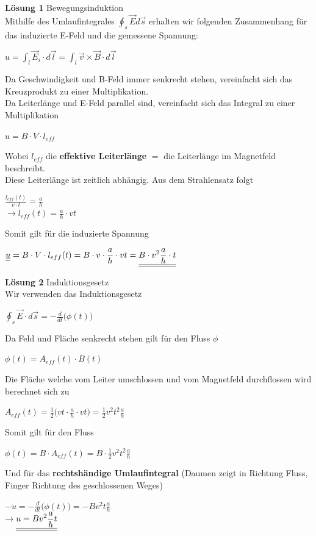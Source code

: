 \beginbsp


\textbf{Lösung 1} Bewegungsinduktion \\
Mithilfe des Umlaufintegrales $\displaystyle \oint_s \vec{E} d\vec{s}$ erhalten wir folgenden Zusammenhang für das induzierte E-Feld und die gemessene Spannung:
\begin{center}
  $ \displaystyle u = \int_l \vec{E}_i \cdot d\vec{l} = \int_l \vec{v} \times \vec{B} \cdot d \vec{l}$
\end{center}
Da Geschwindigkeit und B-Feld immer senkrecht stehen, vereinfacht sich das Kreuzprodukt zu einer Multiplikation. \\
Da Leiterlänge und E-Feld parallel sind, vereinfacht sich das Integral zu einer Multiplikation
\begin{center}
  $\displaystyle u = B \cdot V \cdot l_{eff}$
\end{center}
Wobei $l_{eff}$ die \textbf{effektive Leiterlänge} $=$ die Leiterlänge im Magnetfeld beschreibt. \\
Diese Leiterlänge ist zeitlich abhängig. Aus dem Strahlensatz folgt
\begin{center}
  $\frac{l_{eff}(t)}{v \cdot t} = \frac{a}{h}$ \\
  $\rightarrow l_{eff} (t) =  \frac{a}{h} \cdot vt$
\end{center}
Somit gilt für die induzierte Spannung
\begin{center}

    $\displaystyle  \underline{\underline{ u}} = B \cdot V \cdot l_{eff}(t) = B \cdot v \cdot  \frac{a}{h} \cdot vt =  \underline{\underline{ B \cdot v^2 \frac{a}{h} \cdot t}}$
\end{center}

\textbf{Lösung 2} Induktionsgesetz \\
Wir verwenden das Induktionsgesetz
\begin{center}
  $\displaystyle \oint_s \vec{E} \cdot d\vec{s} = - \frac{d}{dt} \big( \phi (t)\big)$
\end{center}
Da Feld und Fläche senkrecht stehen gilt für den Fluss $\phi$
\begin{center}
  $\phi(t) = A_{eff}(t) \cdot B(t)$
\end{center}
Die Fläche welche vom Leiter umschlossen und vom Magnetfeld durchflossen wird berechnet sich zu
\begin{center}
  $A_{eff} (t) = \frac{1}{2} \big ( vt \cdot \frac{a}{h} \cdot vt \big) = \frac{1}{2} v^2t^2 \frac{a}{h}$
\end{center}
Somit gilt für den Fluss
\begin{center}
  $ \phi(t) =  B \cdot A_{eff}(t) = B \cdot \frac{1}{2} v^2t^2 \frac{a}{h}$
\end{center}
Und für das \textbf{rechtshändige Umlaufintegral} (Daumen zeigt in Richtung Fluss, Finger Richtung des geschlossenen Weges)
\begin{center}
  $ -u = - \frac{d}{dt} \big( \phi(t) \big) = - B v^2 t \frac{a}{h}$ \\
  $ \displaystyle \rightarrow \underline{\underline{ u = B v^2  \frac{a}{h} t }}$
\end{center}
\iend

